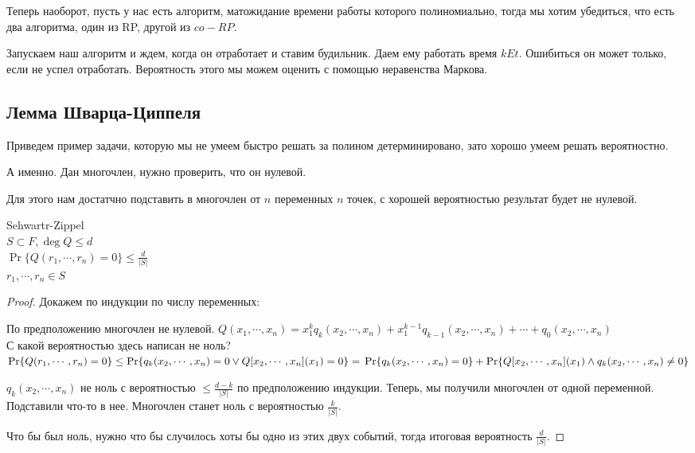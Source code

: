 Теперь наоборот, пусть у нас есть алгоритм, матожидание времени работы которого полиномиально, 
тогда мы хотим убедиться, что есть два алгоритма, один из RP, другой из $co-RP$.

Запускаем наш алгоритм и ждем, когда он отработает и ставим будильник. 
Даем ему работать время $k Et$. Ошибиться он может только, если не успел 
отработать. Вероятность этого мы можем оценить с помощью неравенства Маркова. 

\subsection{Лемма Шварца-Циппеля}

Приведем пример задачи, которую мы не умеем быстро решать за полином детерминировано, 
зато хорошо умеем решать вероятностно. 

А именно. Дан многочлен, нужно проверить, что он нулевой. 

Для этого нам достатчно подставить в многочлен от $n$ переменных $n$ точек, 
с хорошей вероятностью результат будет не нулевой. 

\begin{lemma} Sehwartr-Zippel\\
	$S \subset F, \deg Q \le d$\\
	$\Pr\{Q(r_1, \cdots, r_n) = 0\} \le \frac{d}{|S|}$\\
	$r_1, \cdots, r_n \in S$\\
\end{lemma}

\begin{proof}
	Докажем по индукции по числу переменных:
	
	По предположению многочлен не нулевой. 
	$Q(x_1, \cdots, x_n) = x_1^kq_k(x_2,\cdots, x_n) + x_1^{k - 1}q_{k - 1}(x_2, \cdots, x_n) + \cdots + q_0(x_2, \cdots, x_n)$\\
	
	С какой вероятностью здесь написан не ноль? 
	$\Pr\{Q(r_1, \cdots, r_n) = 0\} \le \Pr\{q_k(x_2, \cdots, x_n) = 0 \vee Q[x_2, \cdots, x_n](x_1) = 0\}  =\\ 
	\Pr\{q_k(x_2, \cdots, x_n) = 0\} + \Pr\{Q[x_2, \cdots, x_n](x_1) \wedge q_k(x_2, \cdots, x_n) \ne 0\}$
	
	
	$q_k(x_2, \cdots, x_n)$ не ноль с вероятностью $\le \frac{d - k}{|S|}$ по предположению индукции. 
	Теперь, мы получили многочлен от одной переменной. Подставили что-то в нее. 
	Многочлен станет ноль с вероятностью $\frac{k}{|S|}$. 
	
	Что бы был ноль, нужно что бы случилось хоты бы одно из этих двух событий, тогда итоговая вероятность $\frac{d}{|S|}$.
\end{proof}

